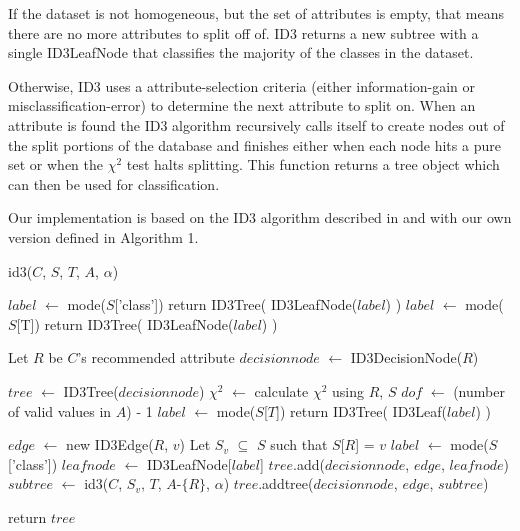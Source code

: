 \documentclass{IEEEtran}
\begin{document}
If the dataset is not homogeneous, but the set of attributes is empty,
that means there are no more attributes to split off of. ID3 returns a
new subtree with a single ID3LeafNode that classifies the majority of
the classes in the dataset.

Otherwise, ID3 uses a attribute-selection criteria (either
information-gain or misclassification-error) to determine the next
attribute to split on. When an attribute is found the ID3 algorithm
recursively calls itself to create nodes out of the split portions of
the database and finishes either when each node hits a pure set or
when the $\chi^2$ test halts splitting. This function returns a tree
object which can then be used for classification.

Our implementation is based on the ID3 algorithm described
in \parencite{quinlan1986induction} and with our own version defined
in Algorithm 1. 


\begin{algorithm}
\label{id3algorithm}
\caption{id3($C$, $S$, $T$, $A$, $\alpha$)}
\begin{algorithmic}
\Statex {}
\Statex {}
\Statex {}
  \State $label$ $\leftarrow$ mode($S$['class'])
  \State return ID3Tree( ID3LeafNode($label$) )
\EndIf
{}
  \State $label$ $\leftarrow$ mode($S$[T])
  \State return ID3Tree( ID3LeafNode($label$) )
\EndIf

\State Let $R$ be $C$'s recommended attribute
\State $decisionnode$ $\leftarrow$ ID3DecisionNode($R$)

\State $tree$ $\leftarrow$ ID3Tree($decisionnode$)
  \State $\chi^2$ $\leftarrow$ calculate $\chi^2$ using $R$, $S$
  \State $dof$ $\leftarrow$ (number of valid values in $A$) - 1
    \State $label$ $\leftarrow$ mode($S$[$T$])
    \State return ID3Tree( ID3Leaf($label$) )
  \EndIf

  \State $edge$ $\leftarrow$ new ID3Edge($R$, $v$)
  \State Let $S_v$ $\subseteq$ $S$ such that $S$[$R$] = $v$
    \State $label$ $\leftarrow$ mode($S$['class'])
    \State $leafnode$ $\leftarrow$ ID3LeafNode[$label$]
    \State $tree$.add($decisionnode$, $edge$, $leafnode$)
  \Else
    \State $subtree$ $\leftarrow$ id3($C$, $S_v$, $T$, $A$-$\lbrace$$R$$\rbrace$, $\alpha$)
    \State $tree$.addtree($decisionnode$, $edge$, $subtree$)
  \EndIf

  return $tree$
\EndFor

\end{algorithmic}
\end{algorithm}
\end{document}

